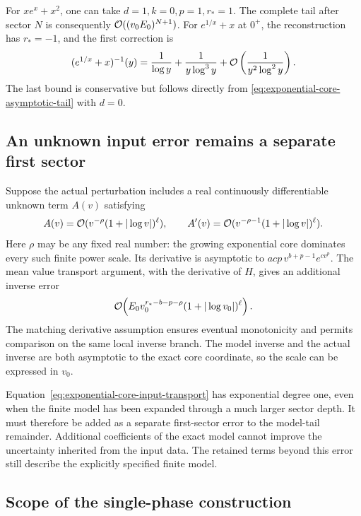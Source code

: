 For $xe^x+x^2$, one can take $d=1,k=0,p=1,r_*=1$.
The complete tail after sector $N$ is consequently
$\mathcal O((v_0E_0)^{N+1})$.
For $e^{1/x}+x$ at $0^+$, the reconstruction has $r_*=-1$,
and the first correction is
\begin{equation}
 (e^{1/x}+x)^{-1}(y)
 =\frac1{\log y}+\frac1{y\log^3y}
 +\mathcal O\left(\frac1{y^2\log^2y}\right).
 \label{eq:finite-endpoint-exponential-core-example}
\end{equation}
The last bound is conservative but follows directly from
\eqref{eq:exponential-core-asymptotic-tail} with $d=0$.

\subsection{An unknown input error remains a separate first sector}

Suppose the actual perturbation includes a real continuously differentiable
unknown term $A(v)$ satisfying
\begin{equation}
 A(v)=\mathcal O(v^{-\rho}(1+|\log v|)^\ell),\qquad
 A'(v)=\mathcal O(v^{-\rho-1}(1+|\log v|)^\ell).
 \label{eq:exponential-core-input-error}
\end{equation}
Here $\rho$ may be any fixed real number: the growing exponential core
dominates every such finite power scale. Its derivative is asymptotic to
$acp\,v^{b+p-1}e^{cv^p}$. The mean value transport argument, with the
derivative of $H$, gives an additional inverse error
\begin{equation}
 \mathcal O\!\left(E_0v_0^{r_*-b-p-\rho}
                  (1+|\log v_0|)^\ell\right).
 \label{eq:exponential-core-input-transport}
\end{equation}
The matching derivative assumption ensures eventual monotonicity and
permits comparison on the same local inverse branch. The model inverse
and the actual inverse are both asymptotic to the exact core coordinate,
so the scale can be expressed in $v_0$.

Equation~\eqref{eq:exponential-core-input-transport} has exponential degree
one, even when the finite model has been expanded through a much larger
sector depth. It must therefore be added as a separate first-sector
error to the model-tail remainder. Additional coefficients of the exact
model cannot improve the uncertainty inherited from the input data. The retained terms beyond this error still describe the explicitly
specified finite model.

\subsection{Scope of the single-phase construction}

